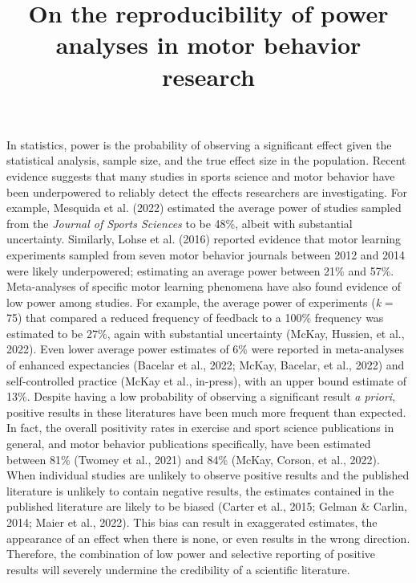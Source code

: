 \documentclass[
  doc, donotrepeattitle,floatsintext]{apa7}
\title{On the reproducibility of power analyses in motor behavior research}
\author{\phantom{0}}
\date{}
\affiliation{\phantom{0}}
\begin{document}
\maketitle

In statistics, power is the probability of observing a significant effect given the statistical analysis, sample size, and the true effect size in the population. Recent evidence suggests that many studies in sports science and motor behavior have been underpowered to reliably detect the effects researchers are investigating. For example, Mesquida et al. (2022) estimated the average power of studies sampled from the \emph{Journal of Sports Sciences} to be 48\%, albeit with substantial uncertainty. Similarly, Lohse et al. (2016) reported evidence that motor learning experiments sampled from seven motor behavior journals between 2012 and 2014 were likely underpowered; estimating an average power between 21\% and 57\%. Meta-analyses of specific motor learning phenomena have also found evidence of low power among studies. For example, the average power of experiments (\emph{k} = 75) that compared a reduced frequency of feedback to a 100\% frequency was estimated to be 27\%, again with substantial uncertainty (McKay, Hussien, et al., 2022). Even lower average power estimates of 6\% were reported in meta-analyses of enhanced expectancies (Bacelar et al., 2022; McKay, Bacelar, et al., 2022) and self-controlled practice (McKay et al., in-press), with an upper bound estimate of 13\%. Despite having a low probability of observing a significant result \emph{a priori}, positive results in these literatures have been much more frequent than expected. In fact, the overall positivity rates in exercise and sport science publications in general, and motor behavior publications specifically, have been estimated between 81\% (Twomey et al., 2021) and 84\% (McKay, Corson, et al., 2022). When individual studies are unlikely to observe positive results and the published literature is unlikely to contain negative results, the estimates contained in the published literature are likely to be biased (Carter et al., 2015; Gelman \& Carlin, 2014; Maier et al., 2022). This bias can result in exaggerated estimates, the appearance of an effect when there is none, or even results in the wrong direction. Therefore, the combination of low power and selective reporting of positive results will severely undermine the credibility of a scientific literature.
\end{document}
